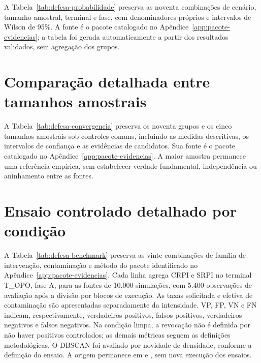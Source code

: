 \documentclass[
	12pt,				%
	openright,			%
	oneside,			%
	a4paper,			%
	chapter=TITLE,		%
	section=TITLE,		%
	subsection=TITLE,	%
	subsubsection=TITLE,%
	english,			%
	brazilian			%
	]{abntex2}
\theoremstyle{definition}
\begin{document}
\begin{apendicesenv}
A Tabela~\ref{tab:defesa-probabilidade} preserva as noventa combinações de
cenário, tamanho amostral, terminal e fase, com denominadores próprios e
intervalos de Wilson de 95\%. A fonte é o pacote catalogado no
Apêndice~\ref{app:pacote-evidencias}; a tabela foi gerada automaticamente
a partir dos resultados validados, sem agregação dos grupos.

\begingroup
\SingleSpacing

\endgroup

\section{Comparação detalhada entre tamanhos amostrais}
\label{app:comparacao-amostral-detalhada}

A Tabela~\ref{tab:defesa-convergencia} preserva os noventa grupos e os
cinco tamanhos amostrais sob controles comuns, incluindo as medidas
descritivas, os intervalos de confiança e as evidências de candidatos.
Sua fonte é o pacote catalogado no
Apêndice~\ref{app:pacote-evidencias}. A maior amostra permanece uma
referência empírica, sem estabelecer verdade fundamental, independência
ou aninhamento entre as fontes.

\begingroup
\SingleSpacing

\endgroup

\section{Ensaio controlado detalhado por condição}
\label{app:benchmark-detalhado}

A Tabela~\ref{tab:defesa-benchmark} preserva as vinte combinações de
família de intervenção, contaminação e método do pacote identificado no
Apêndice~\ref{app:pacote-evidencias}. Cada linha agrega CRPI e SRPI no
terminal T\_OPO, fase A, para as fontes de 10.000 simulações, com 5.400
observações de avaliação após a divisão por blocos de execução. As taxas
solicitada e efetiva de contaminação são apresentadas separadamente da
intensidade. VP, FP, VN e FN indicam, respectivamente, verdadeiros positivos,
falsos positivos, verdadeiros negativos e falsos negativos. Na condição
limpa, a revocação não é definida por não haver positivos controlados;
as demais métricas seguem as definições metodológicas. O DBSCAN foi
avaliado por novidade de densidade, conforme a definição do ensaio.
A origem permanece
em  e
, sem nova execução dos ensaios.


\end{apendicesenv}
\end{document}
